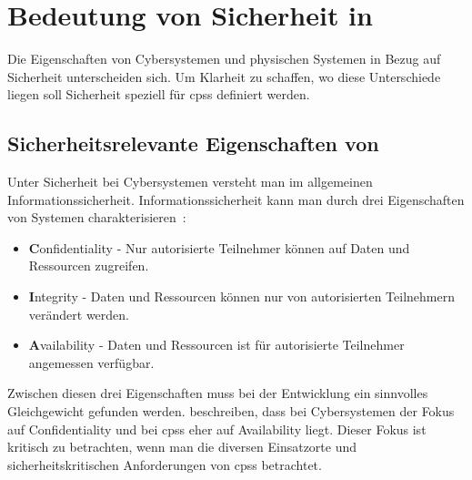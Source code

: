 \documentclass[final,bibliography=totocnumbered]{include/sikseminar}
\newcommand{\fb}[1]{\dofb#1}
\newcommand{\cps}{\glspl{cps}\xspace}
\newcommand{\dofb}[1]{\textbf{#1}\nobreak\hspace{0pt}}
\begin{document}



\section{Bedeutung von Sicherheit in }\label{sec:bedeutung-sicherheit}

Die Eigenschaften von Cybersystemen und physischen Systemen in Bezug auf Sicherheit unterscheiden sich.
Um Klarheit zu schaffen, wo diese Unterschiede liegen soll Sicherheit speziell für \cps definiert werden.

\subsection{Sicherheitsrelevante Eigenschaften von }\label{subsec:definition}
Unter Sicherheit bei Cybersystemen versteht man im allgemeinen Informationssicherheit.
Informationssicherheit kann man durch drei Eigenschaften von Systemen charakterisieren~\cite{Cherdantseva2013}:
\begin{itemize}[noitemsep,wide=0pt]
    \item \fb{Confidentiality} - Nur autorisierte Teilnehmer können auf Daten und Ressourcen zugreifen.\label{def:confidentiality}
    \item \fb{Integrity} - Daten und Ressourcen können nur von autorisierten Teilnehmern verändert werden.\label{def:integrity}
    \item \fb{Availability} - Daten und Ressourcen ist für autorisierte Teilnehmer angemessen verfügbar.\label{def:availability}
\end{itemize}

Zwischen diesen drei Eigenschaften muss bei der Entwicklung ein sinnvolles Gleichgewicht gefunden werden.
\citeauthor{GK16} beschreiben, dass bei Cybersystemen der Fokus auf Confidentiality und bei \cps eher auf Availability liegt.
Dieser Fokus ist kritisch zu betrachten, wenn man die diversen Einsatzorte und sicherheitskritischen Anforderungen von \cps betrachtet.
\end{document}
